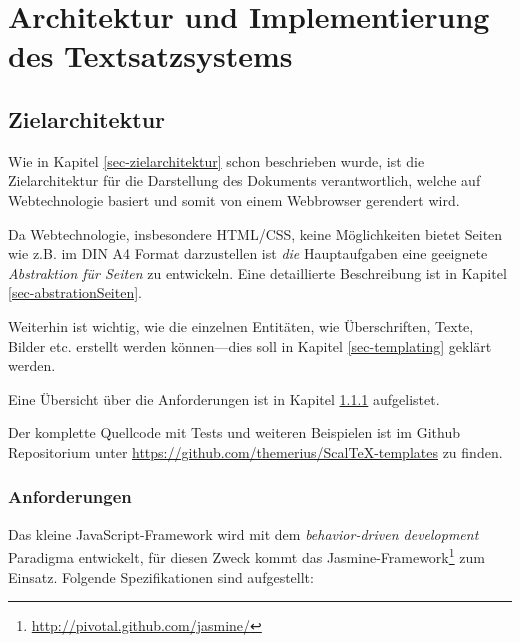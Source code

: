 \chapter{Architektur und Implementierung des Textsatzsystems}\label{ch-architektur}

\section{Zielarchitektur}

Wie in Kapitel \ref{sec-zielarchitektur} schon beschrieben wurde, ist die
Zielarchitektur für die Darstellung des Dokuments verantwortlich, welche
auf Webtechnologie basiert und somit von einem Webbrowser gerendert wird.

Da Webtechnologie, insbesondere HTML/CSS, keine Möglichkeiten bietet
Seiten wie z.B. im DIN A4 Format darzustellen ist \emph{die}
Hauptaufgaben eine geeignete \emph{Abstraktion für Seiten} zu entwickeln.
Eine detaillierte Beschreibung ist in Kapitel \ref{sec-abstrationSeiten}.

Weiterhin ist wichtig, wie die einzelnen Entitäten, wie Überschriften,
Texte, Bilder etc. erstellt werden können---dies soll in Kapitel
\ref{sec-templating} geklärt werden.

Eine Übersicht über die Anforderungen ist in Kapitel
\ref{sec-ziel_anforderungen} aufgelistet.

Der komplette Quellcode mit Tests und weiteren Beispielen ist im
Github Repositorium unter \url{https://github.com/themerius/ScalTeX-templates}
zu finden.

\subsection{Anforderungen}\label{sec-ziel_anforderungen}

Das kleine JavaScript-Framework wird mit dem
\emph{behavior-driven development} Paradigma entwickelt,
für diesen Zweck kommt das
Jasmine-Framework\footnote{\url{http://pivotal.github.com/jasmine/}}
zum Einsatz. Folgende Spezifikationen sind aufgestellt:

